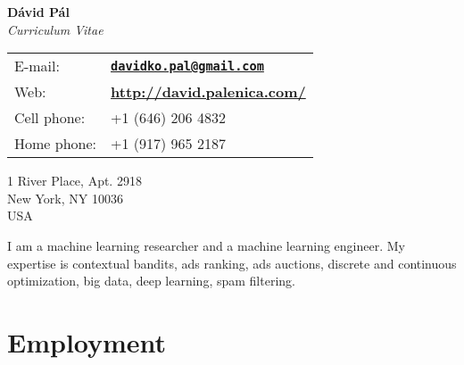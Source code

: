 \documentclass[9pt]{article}
\begin{document}
\begin{center}
{\huge \textbf{D\'avid P\'al}} \\[0.2cm]
\emph{Curriculum Vitae}
\end{center}

\vspace{0.2cm}

%
\noindent
%
\begin{minipage}{10cm}
\begin{tabular}{@{}ll}
E-mail:      & \href{mailto:davidko.pal@gmail.com}{\textbf{\texttt{davidko.pal@gmail.com}}} \\[0.1cm]
Web:         & \textbf{\url{http://david.palenica.com/}} \\[0.1cm]
Cell phone:  & +1 (646) 206 4832 \\[0.1cm]
Home phone:  & +1 (917) 965 2187 \\[0.1cm]
\end{tabular}
\end{minipage}
%
\begin{minipage}{10cm}
1 River Place, Apt. 2918 \\
New York, NY 10036 \\
USA \\
\end{minipage}


\vspace{0.3cm}

\noindent I am a machine learning researcher and a machine learning engineer.
My expertise is contextual bandits, ads ranking, ads auctions, discrete and
continuous optimization, big data, deep learning, spam filtering.

\section*{Employment}
\end{document}

